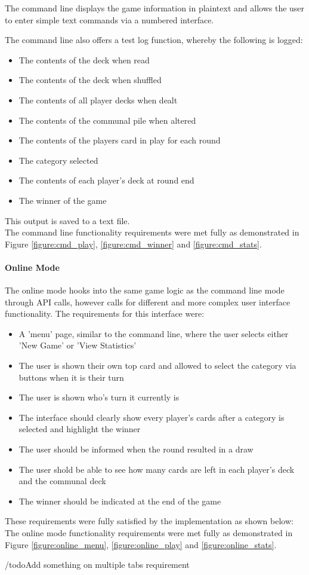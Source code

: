 The command line displays the game information in plaintext and allows the user to enter simple text commands via a numbered interface. \\

\newpage

The command line also offers a test log function, whereby the following is logged:
\begin{itemize}
\item The contents of the deck when read
\item The contents of the deck when shuffled
\item The contents of all player decks when dealt
\item The contents of the communal pile when altered
\item The contents of the players card in play for each round
\item The category selected
\item The contents of each player's deck at round end
\item The winner of the game
\end{itemize}

This output is saved to a text file. \\

The command line functionality requirements were met fully as demonstrated in Figure \ref{figure:cmd_play}, \ref{figure:cmd_winner} and \ref{figure:cmd_stats}.

\paragraph{Online Mode}
The online mode hooks into the same game logic as the command line mode through API calls, however calls for different and more complex user interface functionality. The requirements for this interface were:
\begin{itemize}
\item A 'menu' page, similar to the command line, where the user selects either 'New Game' or 'View Statistics'
\item The user is shown their own top card and allowed to select the category via buttons when it is their turn
\item The user is shown who's turn it currently is
\item The interface should clearly show every player's cards after a category is selected and highlight the winner
\item The user should be informed when the round resulted in a draw
\item The user shold be able to see how many cards are left in each player's deck and the communal deck
\item The winner should be indicated at the end of the game
\end{itemize}

These requirements were fully satisfied by the implementation as shown below:
The online mode functionality requirements were met fully as demonstrated in Figure \ref{figure:online_menu}, \ref{figure:online_play} and \ref{figure:online_stats}.

/todo{Add something on multiple tabs requirement}

